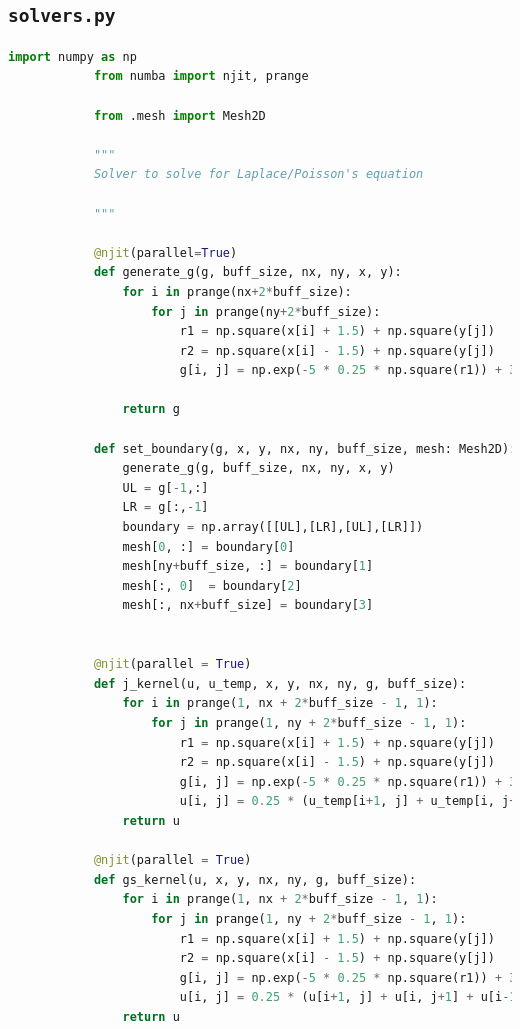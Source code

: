 \documentclass[12pt]{article}
\begin{document}
    \subsection{\texttt{solvers.py}}
        \begin{lstlisting}[language={Python}]
            import numpy as np
            from numba import njit, prange
            
            from .mesh import Mesh2D
            
            """
            Solver to solve for Laplace/Poisson's equation
            
            """
            
            @njit(parallel=True)
            def generate_g(g, buff_size, nx, ny, x, y):
                for i in prange(nx+2*buff_size):
                    for j in prange(ny+2*buff_size):
                        r1 = np.square(x[i] + 1.5) + np.square(y[j])
                        r2 = np.square(x[i] - 1.5) + np.square(y[j])
                        g[i, j] = np.exp(-5 * 0.25 * np.square(r1)) + 3 * 0.5 * np.exp(-np.square(r2))
            
                return g
            
            def set_boundary(g, x, y, nx, ny, buff_size, mesh: Mesh2D):
                generate_g(g, buff_size, nx, ny, x, y)
                UL = g[-1,:]
                LR = g[:,-1]
                boundary = np.array([[UL],[LR],[UL],[LR]])
                mesh[0, :] = boundary[0]
                mesh[ny+buff_size, :] = boundary[1]
                mesh[:, 0]  = boundary[2]
                mesh[:, nx+buff_size] = boundary[3]
            
            
            @njit(parallel = True)
            def j_kernel(u, u_temp, x, y, nx, ny, g, buff_size):
                for i in prange(1, nx + 2*buff_size - 1, 1):
                    for j in prange(1, ny + 2*buff_size - 1, 1):
                        r1 = np.square(x[i] + 1.5) + np.square(y[j])
                        r2 = np.square(x[i] - 1.5) + np.square(y[j])
                        g[i, j] = np.exp(-5 * 0.25 * np.square(r1)) + 3 * 0.5 * np.exp(-np.square(r2))
                        u[i, j] = 0.25 * (u_temp[i+1, j] + u_temp[i, j+1] + u_temp[i-1, j] + u_temp[i, j-1] + g[i, j])
                return u
                
            @njit(parallel = True)
            def gs_kernel(u, x, y, nx, ny, g, buff_size):
                for i in prange(1, nx + 2*buff_size - 1, 1):
                    for j in prange(1, ny + 2*buff_size - 1, 1):
                        r1 = np.square(x[i] + 1.5) + np.square(y[j])
                        r2 = np.square(x[i] - 1.5) + np.square(y[j])
                        g[i, j] = np.exp(-5 * 0.25 * np.square(r1)) + 3 * 0.5 * np.exp(-np.square(r2))
                        u[i, j] = 0.25 * (u[i+1, j] + u[i, j+1] + u[i-1, j] + u[i, j-1] + g[i, j])
                return u
            

\end{lstlisting}
\end{document}
